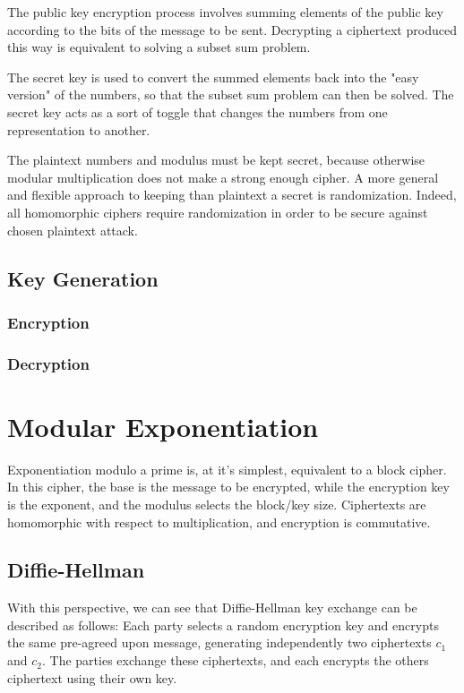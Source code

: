 \documentclass[preprint]{iacrtrans}
\begin{document}
The public key encryption process involves summing elements of the public key according to the bits of the message to be sent. Decrypting a ciphertext produced this way is equivalent to solving a subset sum problem.

The secret key is used to convert the summed elements back into the "easy version" of the numbers, so that the subset sum problem can then be solved. The secret key acts as a sort of toggle that changes the numbers from one representation to another. 

The plaintext numbers and modulus must be kept secret, because otherwise modular multiplication does not make a strong enough cipher. A more general and flexible approach to keeping than plaintext a secret is randomization. Indeed, all homomorphic ciphers require randomization in order to be secure against chosen plaintext attack. 

\subsection{Key Generation}
\subsubsection{Encryption}
\subsubsection{Decryption}

\section{Modular Exponentiation}
Exponentiation modulo a prime is, at it's simplest, equivalent to a block cipher. In this cipher, the base is the message to be encrypted, while the encryption key is the exponent, and the modulus selects the block/key size. Ciphertexts are homomorphic with respect to multiplication, and encryption is commutative.

\subsection{Diffie-Hellman}
With this perspective, we can see that Diffie-Hellman key exchange can be described as follows: Each party selects a random encryption key and encrypts the same pre-agreed upon message, generating independently two ciphertexts $c_1$ and $c_2$. The parties exchange these ciphertexts, and each encrypts the others ciphertext using their own key.
\end{document}
